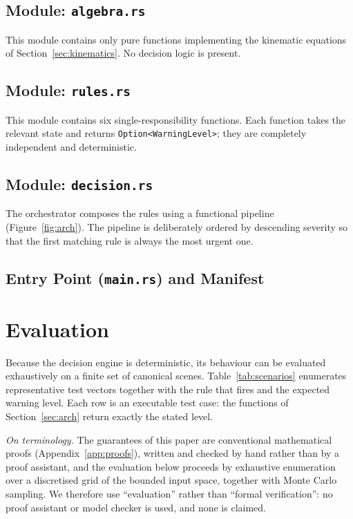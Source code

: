 \documentclass[conference, a4paper]{IEEEtran}
\theoremstyle{plain}
\begin{document}
\subsection{Module: \texttt{algebra.rs}}
\label{sub:algebra}
This module contains only pure functions implementing the kinematic
equations of Section~\ref{sec:kinematics}. No decision logic is present.



\subsection{Module: \texttt{rules.rs}}
\label{sub:rules}
This module contains six single-responsibility functions. Each function
takes the relevant state and returns \texttt{Option<WarningLevel>}; they are
completely independent and deterministic.



\subsection{Module: \texttt{decision.rs}}
\label{sub:decision}
The orchestrator composes the rules using a functional pipeline
(Figure~\ref{fig:arch}). The pipeline is deliberately ordered by descending
severity so that the first matching rule is always the most urgent one.



\subsection{Entry Point (\texttt{main.rs}) and Manifest}





\section{Evaluation}
\label{sec:verif}

Because the decision engine is deterministic, its behaviour can be evaluated
exhaustively on a finite set of canonical scenes. Table~\ref{tab:scenarios}
enumerates representative test vectors together with the rule that fires and
the expected warning level. Each row is an executable test case: the
functions of Section~\ref{sec:arch} return exactly the stated level.

\emph{On terminology.} The guarantees of this paper are conventional
mathematical proofs (Appendix~\ref{app:proofs}), written and checked by hand
rather than by a proof assistant, and the evaluation below proceeds by
exhaustive enumeration over a discretised grid of the bounded input space,
together with Monte Carlo sampling. We therefore use ``evaluation'' rather
than ``formal verification'': no proof assistant or model checker is used,
and none is claimed.
\end{document}
